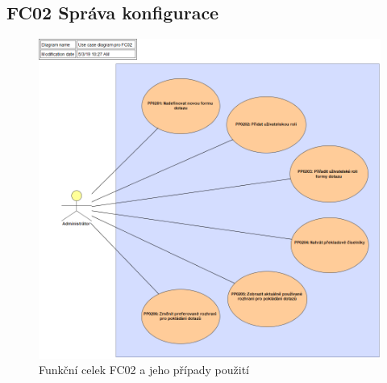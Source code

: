 \documentclass[thesis=M,czech]{FITthesis}[2019/12/23]
\begin{document}
\subsection{FC02 Správa konfigurace}
\label{FC02}
\begin{figure}[H]
  \centering
  \includegraphics[width=\textwidth]{res/design/Use case diagram pro FC02.png}
  \caption{Funkční celek FC02 a jeho případy použití}
  \label{fig:Funkční celek FC02 a jeho případy použití}
\end{figure}

\newpage
\end{document}
